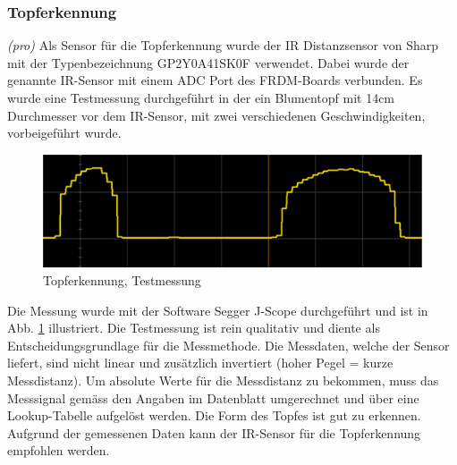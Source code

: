 \subsubsection{Topferkennung} \label{sec:Topferkennung_ProveOfConcept}
\textit{(pro)} Als Sensor für die Topferkennung wurde der IR Distanzsensor von Sharp mit der Typenbezeichnung GP2Y0A41SK0F verwendet. Dabei wurde der genannte IR-Sensor mit einem ADC Port des FRDM-Boards verbunden. Es wurde eine Testmessung durchgeführt in der ein Blumentopf mit 14cm Durchmesser vor dem IR-Sensor, mit zwei verschiedenen Geschwindigkeiten, vorbeigeführt wurde. 

\begin{figure}[H]
	\includegraphics[width=1\textwidth]{Illustrationen/6-Umsetzung/IR_Sensor_Messung.png}
	\caption{Topferkennung, Testmessung}
	\label{fig:IR_Sensor_POC}
\end{figure}

Die Messung wurde mit der Software Segger J-Scope durchgeführt und ist in Abb. \ref{fig:IR_Sensor_POC} illustriert. Die Testmessung ist rein qualitativ und diente als Entscheidungsgrundlage für die Messmethode. Die Messdaten, welche der Sensor liefert, sind nicht linear und zusätzlich invertiert (hoher Pegel = kurze Messdistanz). Um absolute Werte für die Messdistanz zu bekommen, muss das Messsignal gemäss den Angaben im Datenblatt umgerechnet und über eine Lookup-Tabelle aufgelöst werden. Die Form des Topfes ist gut zu erkennen. Aufgrund der gemessenen Daten kann der IR-Sensor für die Topferkennung empfohlen werden.
